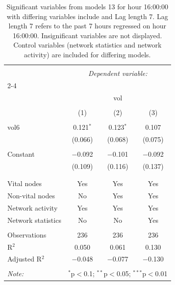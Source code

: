 
\begin{table}[!htbp] \centering 
  \caption{Significant variables from models 13 for hour 16:00:00 with differing variables include 
                               and Lag length 7. Lag length 7 refers to the past 7 hours regressed on hour 16:00:00. 
                               Insignificant variables are not displayed. 
                               Control variables (network statistics and network activity) are 
                               included for differing models.} 
  \label{Volumemodels2_t_hourlagged3} 
\scriptsize 
\begin{tabular}{@{\extracolsep{5pt}}lccc} 
\\[-1.8ex]\hline 
\hline \\[-1.8ex] 
 & \multicolumn{3}{c}{\textit{Dependent variable:}} \\ 
\cline{2-4} 
\\[-1.8ex] & \multicolumn{3}{c}{vol} \\ 
\\[-1.8ex] & (1) & (2) & (3)\\ 
\hline \\[-1.8ex] 
 vol6 & 0.121$^{*}$ & 0.123$^{*}$ & 0.107 \\ 
  & (0.066) & (0.068) & (0.075) \\ 
  & & & \\ 
 Constant & $-$0.092 & $-$0.101 & $-$0.092 \\ 
  & (0.109) & (0.116) & (0.137) \\ 
  & & & \\ 
\hline \\[-1.8ex] 
Vital nodes & Yes & Yes & Yes \\ 
Non-vital nodes & No & Yes & Yes \\ 
Network activity & Yes & Yes & Yes \\ 
Network statistics & No & No & Yes \\ 
\hline &  &  &  \\ 
Observations & 236 & 236 & 236 \\ 
R$^{2}$ & 0.050 & 0.061 & 0.130 \\ 
Adjusted R$^{2}$ & $-$0.048 & $-$0.077 & $-$0.130 \\ 
\hline 
\hline \\[-1.8ex] 
\textit{Note:}  & \multicolumn{3}{r}{$^{*}$p$<$0.1; $^{**}$p$<$0.05; $^{***}$p$<$0.01} \\ 
\end{tabular} 
\end{table} 
